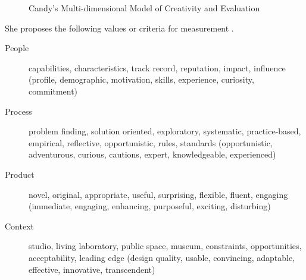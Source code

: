 \begin{figure}[!htbp]
  \caption[Candy's MMCE]{Candy's Multi-dimensional Model of Creativity and Evaluation}
  \label{fig:mmce}
\end{figure}

She proposes the following values or criteria for measurement \autocite*{Candy2012}.

\begin{description}
  \item [People] capabilities, characteristics, track record, reputation, impact, influence (profile, demographic, motivation, skills, experience, curiosity, commitment)
  \item [Process] problem finding, solution oriented, exploratory, systematic, practice-based, empirical, reflective, opportunistic, rules, standards (opportunistic, adventurous, curious, cautions, expert, knowledgeable, experienced)
  \item [Product] novel, original, appropriate, useful, surprising, flexible, fluent, engaging (immediate, engaging, enhancing, purposeful, exciting, disturbing)
  \item [Context] studio, living laboratory, public space, museum, constraints, opportunities, acceptability, leading edge (design quality, usable, convincing, adaptable, effective, innovative, transcendent)
\end{description}


